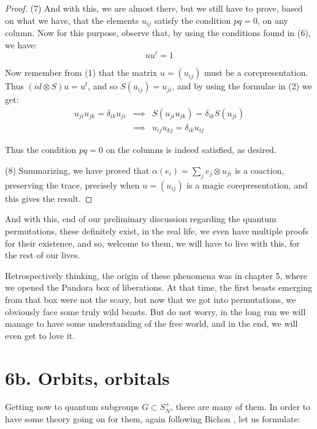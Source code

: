 \documentclass[12pt]{amsbook}
\begin{document}
\begin{proof}
\medskip

(7) And with this, we are almost there, but we still have to prove, based on what we have, that the elements $u_{ij}$ satisfy the condition $pq=0$, on any column. Now for this purpose, observe that, by using the conditions found in (6), we have:
$$uu^t=1$$

Now remember from (1) that the matrix $u=(u_{ij})$ must be a corepresentation. Thus $(id\otimes S)u=u^t$, and so $S(u_{ij})=u_{ji}$, and by using the formulae in (2) we get:
\begin{eqnarray*}
u_{ji}u_{jk}=\delta_{ik}u_{ji}
&\implies&S(u_{ji}u_{jk})=\delta_{ik}S(u_{ji})\\
&\implies&u_{ij}u_{kj}=\delta_{ik}u_{ij}
\end{eqnarray*}

Thus the condition $pq=0$ on the columns is indeed satisfied, as desired.

\medskip

(8) Summarizing, we have proved that $\alpha(e_i)=\sum_je_j\otimes u_{ji}$ is a coaction, preserving the trace, precisely when $u=(u_{ij})$ is a magic corepresentation, and this gives the result.
\end{proof}

And with this, end of our preliminary discussion regarding the quantum permutations, these definitely exist, in the real life, we even have multiple proofs for their existence, and so, welcome to them, we will have to live with this, for the rest of our lives.

\bigskip

Retrospectively thinking, the origin of these phenomena was in chapter 5, where we opened the Pandora box of liberations. At that time, the first beasts emerging from that box were not the scary, but now that we got into permutations, we obviously face some truly wild beasts. But do not worry, in the long run we will manage to have some understanding of the free world, and in the end, we will even get to love it.

\section*{6b. Orbits, orbitals} 

Getting now to quantum subgroups $G\subset S_N^+$, there are many of them. In order to have some theory going on for them, again following Bichon \cite{bi4}, let us formulate:

\end{document}
